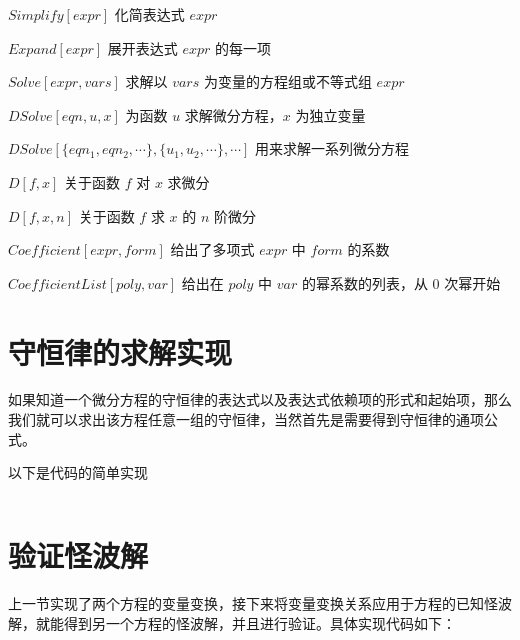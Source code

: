 $Simplify[expr]$  \quad   化简表达式 $expr$

$Expand[expr]$ \quad    展开表达式 $expr$ 的每一项

$Solve[expr, vars]$  \quad 求解以 $vars$ 为变量的方程组或不等式组 $expr$

$DSolve[eqn, u, x]$ \quad  为函数 $u$ 求解微分方程，$x$ 为独立变量

$DSolve[\{eqn_1, eqn_2, \cdots \}, \{u_1, u_2, \cdots \}, \cdots ]$ \quad  用来求解一系列微分方程

$D[f,x]$     \quad  关于函数 $f$ 对 $x$ 求微分

$D[f,{x,n}]$     \quad     关于函数 $f$ 求 $x$ 的 $n$ 阶微分

$Coefficient[expr, form]$   \quad  给出了多项式 $expr$ 中 $form$ 的系数

$CoefficientList[poly, var]$   \quad  给出在 $poly$ 中 $var$ 的幂系数的列表，从 0 次幂开始

\section{守恒律的求解实现}
如果知道一个微分方程的守恒律的表达式以及表达式依赖项的形式和起始项，那么我们就可以求出该方程任意一组的守恒律，当然首先是需要得到守恒律的通项公式。

以下是代码的简单实现
\begin{lstlisting}[language=Mathematica,caption=变量变换方法的实现]

\end{lstlisting}


\section{验证怪波解}
上一节实现了两个方程的变量变换，接下来将变量变换关系应用于方程的已知怪波解，就能得到另一个方程的怪波解，并且进行验证。具体实现代码如下：

